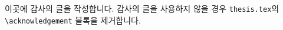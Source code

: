 이곳에 감사의 글을 작성합니다. 감사의 글을 사용하지 않을 경우
\texttt{thesis.tex}의 \texttt{\textbackslash acknowledgement} 블록을 제거합니다.
